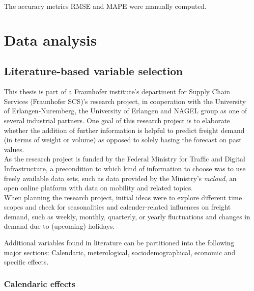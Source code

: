 \documentclass[a4paper, 11pt]{article}
\begin{document}
The accuracy metrics RMSE and MAPE were manually computed.\\





\section{Data analysis}
\subsection{Literature-based variable selection}

This thesis is part of a Fraunhofer institute's department for Supply Chain Services (Fraunhofer SCS)'s research project, in cooperation with the University of Erlangen-Nuremberg, the University of Erlangen and NAGEL group as one of several industrial partners. 
One goal of this research project is to elaborate whether the addition of further information is helpful to predict freight demand (in terms of weight or volume) as opposed to solely basing the forecast on past values.\\
As the research project is funded by the Federal Ministry for Traffic and Digital Infrastructure, a precondition to which kind of information to choose was to use freely available data sets, such as data provided by the Ministry's \textit{mcloud}, an open online platform with data on mobility and related topics. \\
When planning the research project, initial ideas were to explore different time scopes and check for seasonalities and calender-related influences on freight demand, such as weekly, monthly, quarterly, or yearly fluctuations and changes in demand due to (upcoming) holidays. \

Additional variables found in literature can be partitioned into the following major sections: Calendaric, meterological, sociodemographical, economic and specific effects.




\subsubsection{Calendaric effects}
\end{document}
